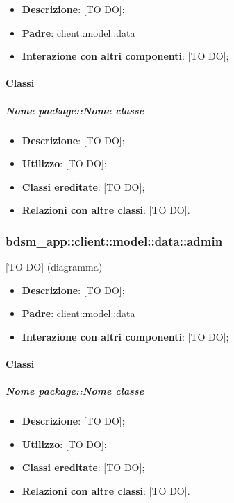 	\begin{itemize}
		\item \textbf{Descrizione}: [TO DO];
		\item \textbf{Padre}: client::model::data
		\item \textbf{Interazione con altri componenti}: [TO DO];
	\end{itemize}

		\paragraph{Classi} %
			\subparagraph{Nome package::Nome classe} %
			\label{subp:subparagraph_name}
				\begin{itemize}
					\item \textbf{Descrizione}: [TO DO];
					\item \textbf{Utilizzo}: [TO DO];
					\item \textbf{Classi ereditate}: [TO DO];
					\item \textbf{Relazioni con altre classi}: [TO DO].
				\end{itemize}	

	\subsubsection{bdsm\_app::client::model::data::admin} %
	\label{ssub:bdsm_app_client_model_data_admin}
	[TO DO] (diagramma) \newline \newline

	\begin{itemize}
		\item \textbf{Descrizione}: [TO DO];
		\item \textbf{Padre}: client::model::data
		\item \textbf{Interazione con altri componenti}: [TO DO];
	\end{itemize}

		\paragraph{Classi} %
			\subparagraph{Nome package::Nome classe} %
			\label{subp:subparagraph_name}
				\begin{itemize}
					\item \textbf{Descrizione}: [TO DO];
					\item \textbf{Utilizzo}: [TO DO];
					\item \textbf{Classi ereditate}: [TO DO];
					\item \textbf{Relazioni con altre classi}: [TO DO].
				\end{itemize}	


